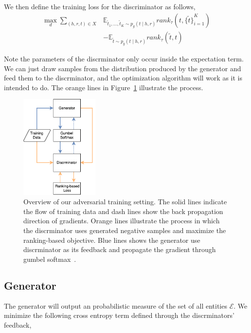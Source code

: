 \documentclass[twocolumn,a4paper,10pt,review,5p]{elsarticle}
\begin{document}
We then define the training loss for the discriminator as follows,
\begin{align*}
    \max_d \sum_{(h, r, t)\in X}
        &\mathbb{E}_{\tilde t_1, \dots, \tilde t_K \sim p_g(t \mid h, r)}
            rank_\tau(t, {\{\tilde t \}}_{i=1}^K) \\
        &- \mathbb{E}_{\tilde t \sim p_g(t \mid h, r)}
            rank_\tau(\tilde t, t)
\end{align*}

Note the parameters of the discrminator only occur inside the expectation term. We can just draw samples from the distribution produced by the generator and feed them to the discrminator, and the optimization algorithm will work as it is intended to do. The orange lines in Figure~\ref{system-overview} illustrate the process.

\begin{figure}[ht]
    \centering
    \includegraphics[width=0.35\textwidth]{images/overview.pdf}
    \caption{Overview of our adversarial training setting. The solid lines indicate the flow of training data and dash lines show the back propagation direction of gradients. Orange lines illustrate the process in which the discrminator uses generated negative samples and maximize the ranking-based objective. Blue lines shows the generator use discrminator as its feedback and propagate the gradient through gumbel softmax~\cite{GumbelSoftmax_Jiang_2016}.}
\label{system-overview}
\end{figure}


\subsection{Generator}

The generator will output an probabilistic measure of the set of all entities $\mathcal{E}$. We minimize the following cross entropy term defined through the discrminators' feedback,
\end{document}
